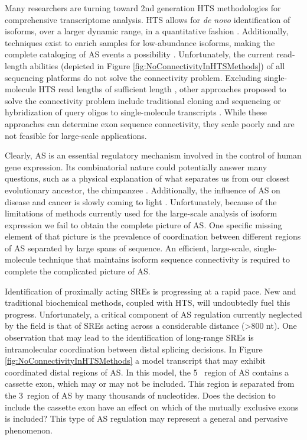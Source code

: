     Many researchers are turning toward 2nd generation HTS methodologies for comprehensive transcriptome analysis. HTS allows for \textit{de novo} identification of isoforms, over a larger dynamic range, in a quantitative fashion \citep{Mortazavi2008}. Additionally, techniques exist to enrich samples for low-abundance isoforms, making the complete cataloging of AS events a possibility \citep{Djebali2008, Salehi-Ashtiani2008}. Unfortunately, the current read-length abilities (depicted in Figure \ref{fig:NoConnectivityInHTSMethods}) of all sequencing platforms do not solve the connectivity problem. Excluding single-molecule HTS read lengths of sufficient length \citep{Shendure2004}, other approaches proposed to solve the connectivity problem include traditional cloning and sequencing or hybridization of query oligos to single-molecule transcripts \citep{Zhu2003, Calarco2007, Emerick2007}. While these approaches can determine exon sequence connectivity, they scale poorly and are not feasible for large-scale applications. 

    Clearly, AS is an essential regulatory mechanism involved in the control of human gene expression. Its combinatorial nature could potentially answer many questions, such as a physical explanation of what separates us from our closest evolutionary ancestor, the chimpanzee \citep{Calarco2007a}. Additionally, the influence of AS on disease and cancer is slowly coming to light \citep{Tazi2009}. Unfortunately, because of the limitations of methods currently used for the large-scale analysis of isoform expression we fail to obtain the complete picture of AS. One specific missing element of that picture is the prevalence of coordination between different regions of AS separated by large spans of sequence. An efficient, large-scale, single-molecule technique that maintains isoform sequence connectivity is required to complete the complicated picture of AS.

    Identification of proximally acting SREs is progressing at a rapid pace. New and traditional biochemical methods, coupled with HTS, will undoubtedly fuel this progress. Unfortunately, a critical component of AS regulation currently neglected by the field is that of SREs acting across a considerable distance (>800 nt). One observation that may lead to the identification of long-range SREs is intramolecular coordination between distal splicing decisions. In Figure \ref{fig:NoConnectivityInHTSMethods} a model transcript that may exhibit coordinated distal regions of AS. In this model, the 5\textprime~ region of AS contains a cassette exon, which may or may not be included. This region is separated from the 3\textprime~region of AS by many thousands of nucleotides. Does the decision to include the cassette exon have an effect on which of the mutually exclusive exons is included? This type of AS regulation may represent a general and pervasive phenomenon.


